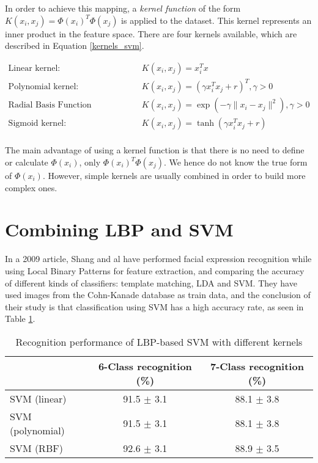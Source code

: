 \noindent In order to achieve this mapping, a \textit{kernel function} of the form $K(x_i, x_j) = \Phi(x_i)^T \Phi(x_j)$ is applied to the dataset. This kernel represents an inner product in the feature space. There are four kernels available, which are described in Equation \ref{kernels_svm}.
\newline

\begin{equation}
\begin{array}{ll}
	\text{Linear kernel:} & K(x_i,x_j) = x_i^Tx \\
	\text{Polynomial kernel:} & K(x_i,x_j) = (\gamma x_i^Tx_j + r)^T, \gamma > 0 \\
	\text{Radial Basis Function (Gaussian) kernel:} & K(x_i,x_j) = \exp(-\gamma \| x_i - x_j \|^2), \gamma > 0 \\
	\text{Sigmoid kernel:} & K(x_i,x_j) = \tanh(\gamma x_i^T x_j + r)\\
\end{array}
\label{kernels_svm}
\end{equation}

\noindent The main advantage of using a kernel function is that there is no need to define or calculate $\Phi(x_i)$, only $\Phi(x_i)^T \Phi(x_j)$. We hence do not know the true form of $\Phi(x_i)$. However, simple kernels are usually combined in order to build more complex ones.
\newline

\section{Combining LBP and SVM}

\vspace{\baselineskip}
\noindent In a 2009 article, Shang and al \cite{SHA09} have performed facial expression recognition while using Local Binary Patterns for feature extraction, and comparing the accuracy of different kinds of classifiers:  template matching,  LDA and SVM. They have used images from the Cohn-Kanade database as train data, and the conclusion of their study is that classification using SVM has a high accuracy rate, as seen in Table \ref{accuracy_svm_lbp}. 
\newline

\begin{table}[h]
   \caption{\label{accuracy_svm_lbp} Recognition performance of LBP-based SVM with different kernels}
\begin{tabular}{|lcc|}
\hline
 & 6-Class recognition (\%) &  7-Class recognition (\%) \\
 \hline
 SVM (linear) & 91.5 $\pm$ 3.1 & 88.1 $\pm$ 3.8 \\
 SVM (polynomial) & 91.5 $\pm$ 3.1 & 88.1 $\pm$ 3.8 \\
 SVM (RBF) & 92.6 $\pm$ 3.1 & 88.9 $\pm$ 3.5 \\
 \hline
\end{tabular}
\end{table}

